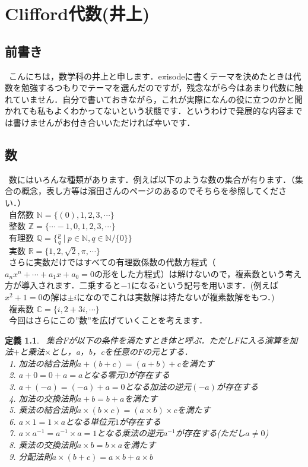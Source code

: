 \documentclass{jreport}
\theoremstyle{idefinition}
\newtheorem{idefi}{定義}[section]
\begin{document}
\chapter{Clifford代数(井上)}

\section{前書き}
\ こんにちは，数学科の井上と申します．e$\pi$isodeに書くテーマを決めたときは代数を勉強するつもりでテーマを選んだのですが，残念ながら今はあまり代数に触れていません．自分で書いておきながら，これが実際になんの役に立つのかと聞かれても私もよくわかってないという状態です．というわけで発展的な内容までは書けませんがお付き合いいただければ幸いです．\\

\section{数}
\ 数にはいろんな種類があります．例えば以下のような数の集合が有ります．（集合の概念，表し方等は濱田さんのページのあるのでそちらを参照してください．）\\
\ 自然数 $\mathbb{N} = \{(0),1,2,3,\cdots \}$\\
\ 整数 $\mathbb{Z} = \{\cdots-1,0,1,2,3,\cdots \}$\\
\ 有理数 $\mathbb{Q} = \{\frac{p}{q}\ |\ p\in \mathbb{N},q\in\mathbb{N}/\{ 0\} \}$\\
\ 実数 $\mathbb{R}=\{1,2,\sqrt{2},\pi,\cdots \}$\\
\ さらに実数だけではすべての有理数係数の代数方程式（$a_nx^n+\cdots +a_1x+a_0=0$の形をした方程式）は解けないので，複素数という考え方が導入されます．二乗すると$-1$になる$i$という記号を用います．(例えば$x^2+1=0$の解は$\pm i$になのでこれは実数解は持たないが複素数解をもつ．)\\
\ 複素数 $\mathbb{C}=\{i ,2+3i ,\cdots \}$\\
\ 今回はさらにこの''数''を広げていくことを考えます．\\

\begin{idefi} 
\ 集合$F$が以下の条件を満たすとき体と呼ぶ．ただし$F$に入る演算を加法$+$と乗法$\times$とし，a，b，cを任意の$F$の元とする．\\
\ 1. 加法の結合法則$a+(b+c)=(a+b)+c$を満たす\\
\ 2. $a+0=0+a=a$となる零元$0$が存在する\\
\ 3. $a+(-a)=(-a)+a=0$となる加法の逆元$(-a)$が存在する\\
\ 4. 加法の交換法則$a+b=b+a$を満たす\\
\ 5. 乗法の結合法則$a\times(b\times c)=(a\times b)\times c$を満たす\\
\ 6. $a\times1=1\times a$となる単位元$1$が存在する\\
\ 7. $a\times a^{-1}=a^{-1} \times a=1$となる乗法の逆元$a^{-1}$が存在する(ただし$a\neq 0$)\\
\ 8. 乗法の交換法則$a\times b=b\times a$を満たす\\
\ 9. 分配法則$a\times(b+c)=a\times b+a \times b$
\end{idefi} 
\end{document}
